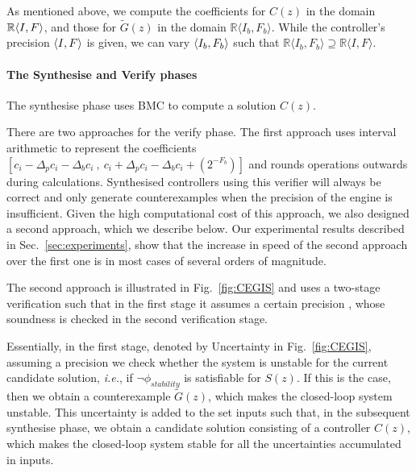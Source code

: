 \documentclass{sig-alternate-05-2015}
\newcommand{\red}[1]{{\color{red}#1}}
\begin{document}
As mentioned above, we compute the coefficients for $C(z)$ 
in the domain $\mathbb{R}\langle{I},{F}\rangle$, 
and those for $\tilde G(z)$ in the domain
$\mathbb{R}\langle I_b,F_b \rangle$.
While the controller's precision $\langle{I},{F}\rangle$ is given, 
we can vary $\langle{I_b},{F_b}\rangle$ such that 
$\mathbb{R}\langle I_b,F_b \rangle \supseteq \mathbb{R}\langle I,F \rangle$.

\paragraph{The {\sc Synthesise} and {\sc Verify} phases}
The {\sc synthesise} phase uses BMC to 
compute a solution $C(z)$. %

There are two approaches for the {\sc verify} phase.
The first approach uses interval arithmetic \cite{moore1966interval}
to represent the coefficients
$[{c}_i-\Delta_p{c}_i-\Delta_b{c}_i\ ,\
{c}_i+\Delta_p{c}_i-\Delta_b{c}_i+(2^{-F_b})]$ 
and rounds operations outwards during calculations. 
Synthesised controllers using this verifier will always
be correct and only generate counterexamples when the precision of the
engine is insufficient. Given the high computational cost of this
approach, we also designed a second approach, which we describe below.
Our experimental results described in Sec.~\ref{sec:experiments},  
show that the increase in speed of the second approach 
over the first one is in most cases of several orders of magnitude.

The second approach is illustrated in Fig.~\ref{fig:CEGIS} and 
uses a two-stage verification such that in the first stage it 
assumes a certain precision , whose 
soundness is checked in the second verification stage.

Essentially, in the first stage, denoted by {\sc Uncertainty} in Fig.~\ref{fig:CEGIS}, 
assuming a precision \param{I_b}{F_b} 
we check whether the system is unstable for the current candidate solution,
{\it i.e.}, if $\neg \phi_{stability}$ is satisfiable for $S(z)$.
If this is the case, then we obtain a counterexample 
$\tilde G(z)$, 
which makes the closed-loop system unstable. 
This uncertainty is added to 
the set {\sc inputs} such that, in the subsequent {\sc synthesise} phase, 
we obtain a candidate solution consisting 
of a controller $C(z)$, which makes the closed-loop 
system stable for all the uncertainties accumulated in {\sc inputs}.
\end{document}
